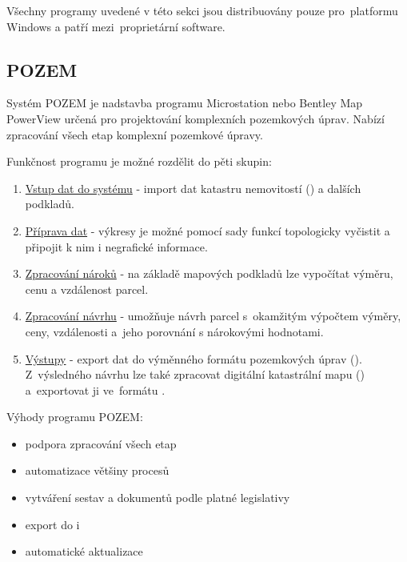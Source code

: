 Všechny programy uvedené v této sekci jsou distribuovány pouze pro~platformu Windows a patří mezi~proprietární software.

\subsection{POZEM}
\label{pozem}

Systém POZEM \citep{pozem} je nadstavba programu Microstation nebo Bentley Map PowerView určená pro projektování komplexních pozemkových úprav. Nabízí zpracování všech etap komplexní pozemkové úpravy.

Funkčnost programu je možné rozdělit do pěti skupin:
	\begin{enumerate}[leftmargin=1.5cm]
		\item \underline{Vstup dat do systému} - import dat katastru nemovitostí () a dalších podkladů.
		\item \underline{Příprava dat} - výkresy je možné pomocí sady funkcí topologicky vyčistit a připojit k nim i negrafické informace.
		\item \underline{Zpracování nároků} - na základě mapových podkladů lze vypočítat výměru, cenu a vzdálenost parcel. 
		\item \underline{Zpracování návrhu} - umožňuje návrh parcel s~okamžitým výpočtem výměry, ceny, vzdálenosti a~jeho porovnání s nárokovými hodnotami.
		\item \underline{Výstupy} - export dat do výměnného formátu pozemkových úprav (). Z~výsledného návrhu lze také zpracovat digitální katastrální mapu () a~exportovat ji ve~formátu .
	\end{enumerate}

Výhody programu POZEM:
	\begin{itemize}[leftmargin=1.5cm]
		\item podpora zpracování všech etap 
		\item automatizace většiny procesů 
		\item vytváření sestav a dokumentů podle platné legislativy
		\item export do  i~
		\item automatické aktualizace
	\end{itemize}

